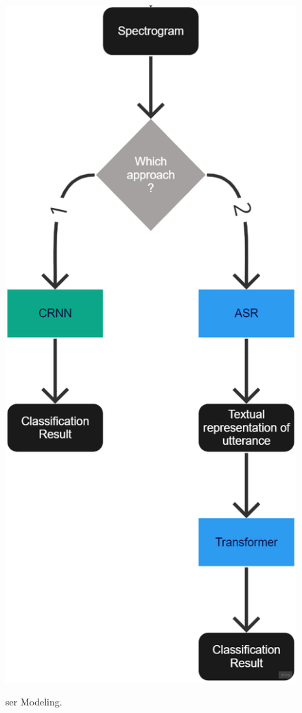 \begin{figure}[h!]
\centering
\includegraphics[scale=0.6]{images/SER_Modeling.png}\\
\caption{\acrshort{ser} Modeling.}\label{fig:ser_modeling}
\end{figure}
